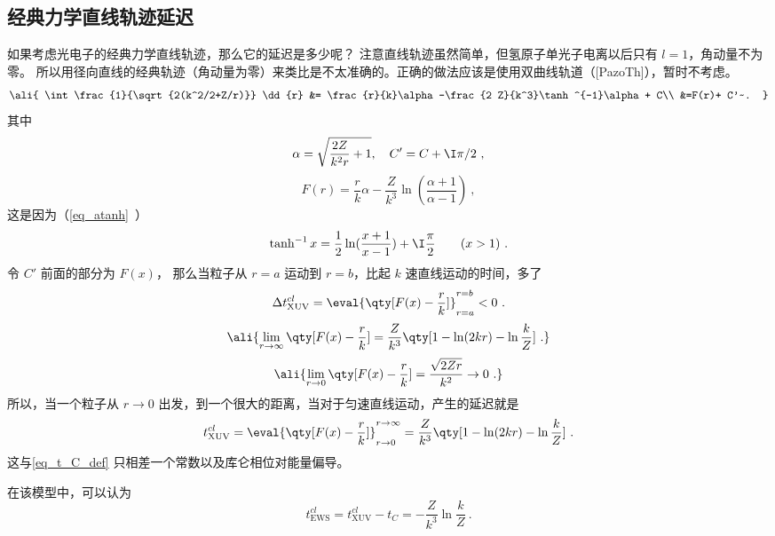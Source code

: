 \subsection{经典力学直线轨迹延迟}
如果考虑光电子的经典力学直线轨迹，那么它的延迟是多少呢？ 注意直线轨迹虽然简单，但氢原子单光子电离以后只有 $l=1$，角动量不为零。 所以用径向直线的经典轨迹（角动量为零）来类比是不太准确的。正确的做法应该是使用双曲线轨道（[PazoTh]），暂时不考虑。
\begin{equation}\ali{
\int \frac{1}{\sqrt{2(k^2/2+Z/r)}} \dd{r} &= \frac{r}{k}\alpha-\frac{2 Z}{k^3}\tanh ^{-1}\alpha + C\\
&=F(r)+ C'~.
}\end{equation}
其中
\begin{equation}
\alpha = \sqrt{\frac{2 Z}{k^2 r}+1},
\quad C' = C + \I \pi/2~,
\end{equation}
\begin{equation}\label{eq_HeAna2_7}
F(r) = \frac{r}{k}\alpha-\frac{Z}{k^3}\ln(\frac{\alpha+1}{\alpha-1})~,
\end{equation}
这是因为（\autoref{eq_atanh}~）
\begin{equation}
\tanh ^{-1} x
= \frac12 \ln(\frac{x+1}{x-1})+\I \frac{\pi}{2} \qquad (x > 1)~.
\end{equation}
令 $C'$ 前面的部分为 $F(x)$， 那么当粒子从 $r=a$ 运动到 $r=b$，比起 $k$ 速直线运动的时间，多了
\begin{equation}
\Delta t_\text{XUV}^{cl} = \eval{\qty[F(x)-\frac{r}{k}]}_{r=a}^{r=b} < 0~.
\end{equation}
\begin{equation}\ali{
\lim_{r\to \infty} \qty[F(x)-\frac{r}{k}] =
\frac{Z}{k^3}\qty[1-\ln(2k r)-\ln\frac{k}{Z}]~.
}\end{equation}
\begin{equation}\ali{
\lim_{r\to 0} \qty[F(x)-\frac{r}{k}] =
\frac{\sqrt{2Zr}}{k^2} \to 0~.
}\end{equation}
所以，当一个粒子从 $r\to 0$ 出发，到一个很大的距离，当对于匀速直线运动，产生的延迟就是
\begin{equation}
t_\text{XUV}^{cl} = \eval{\qty[F(x)-\frac{r}{k}]}_{r\to0}^{r\to\infty} = \frac{Z}{k^3}\qty[1-\ln(2kr)-\ln\frac{k}{Z}]~.
\end{equation}
这与\autoref{eq_t_C_def} 只相差一个常数以及库仑相位对能量偏导。

在该模型中，可以认为
\begin{equation}
t_\text{EWS}^{cl} = t_\text{XUV}^{cl} - t_C = -\frac{Z}{k^3}\ln\frac{k}{Z}~.
\end{equation}


